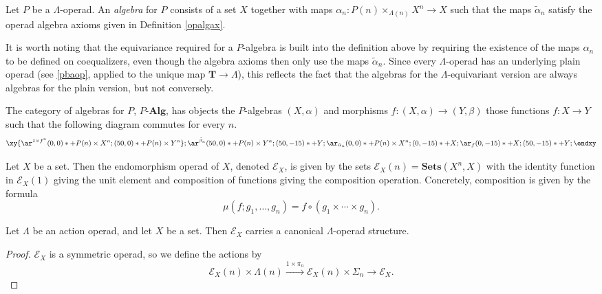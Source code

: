\documentclass{amsbook} %
\newcommand{\mb}{\mathbf}
\numberwithin{section}{chapter}
\begin{document}
\begin{Defi}
Let $P$ be a $\Lambda$-operad.  An \textit{algebra} for $P$ consists of a set $X$ together with maps $\alpha_{n}:P(n) \times_{\Lambda(n)} X^{n} \rightarrow X$ such that the maps $\tilde{\alpha}_{n}$ satisfy the operad algebra axioms given in Definition \ref{opalgax}.
\end{Defi}

\begin{rem}
It is worth noting that the equivariance required for a $P$-algebra is built into the definition above by requiring the existence of the maps $\alpha_{n}$ to be defined on coequalizers, even though the algebra axioms then only use the maps $\tilde{\alpha}_{n}$.  Since every $\Lambda$-operad has an underlying plain operad (see \ref{pbaop}, applied to the unique map $\mb{T} \rightarrow \Lambda$), this reflects the fact that the algebras for the $\Lambda$-equivariant version are always algebras for the plain version, but not conversely.
\end{rem}

\begin{Defi}
The category of algebras for $P$, $P\mbox{-}\mb{Alg}$, has objects the $P$-algebras $(X, \alpha)$ and morphisms $f: (X, \alpha) \rightarrow (Y, \beta)$ those functions $f:X \rightarrow Y$ such that the following diagram commutes for every $n$.
\[
\xy
{\ar^{1 \times f^{n}} (0,0)*+{P(n) \times X^{n}}; (50,0)*+{P(n) \times Y^{n}} };
{\ar^{\tilde{\beta}_{n}} (50,0)*+{P(n) \times Y^{n}}; (50,-15)*+{Y} };
{\ar_{\tilde{\alpha}_{n}} (0,0)*+{P(n) \times X^{n}}; (0,-15)*+{X} };
{\ar_{f} (0,-15)*+{X}; (50,-15)*+{Y} };
\endxy
\]
\end{Defi}

Let $X$ be a set.  Then the endomorphism operad of $X$, denoted $\mathcal{E}_{X}$, is given by the sets $\mathcal{E}_{X}(n) = \mb{Sets}(X^{n}, X)$ with the identity function in $\mathcal{E}_{X}(1)$ giving the unit element and composition of functions giving the composition operation.  Concretely, composition is given by the formula
\[
\mu(f; g_{1}, \ldots, g_{n}) = f \circ (g_{1} \times \cdots \times g_{n}).
\]

\begin{lem}
Let $\Lambda$ be an action operad, and let $X$ be a set.  Then $\mathcal{E}_{X}$ carries a canonical $\Lambda$-operad structure.
\end{lem}
\begin{proof}
$\mathcal{E}_{X}$ is a symmetric operad, so we define the actions by
\[
\mathcal{E}_{X}(n) \times \Lambda(n) \stackrel{1 \times \pi_{n}}{\longrightarrow} \mathcal{E}_{X}(n) \times \Sigma_{n} \rightarrow \mathcal{E}_{X}.
\]
\end{proof}
\end{document}
